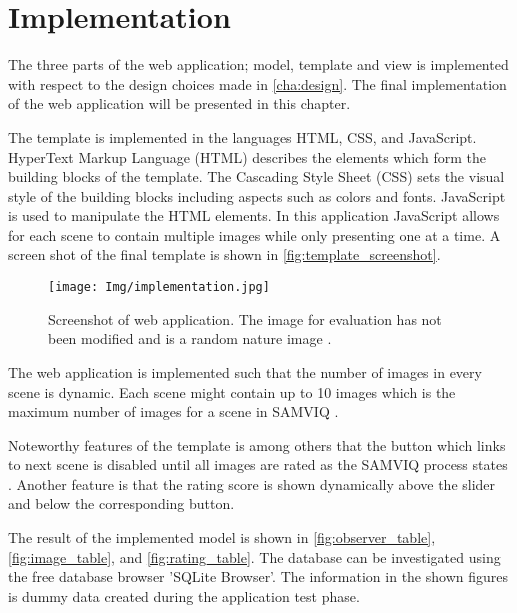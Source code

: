 \graphicspath{{Chapters/Implementation/}}

\chapter{Implementation}
\label{cha:implementation}

The three parts of the web application; model, template and view is implemented with respect to the design choices made in \autoref{cha:design}. The final implementation of the web application will be presented in this chapter.

The template is implemented in the languages HTML, CSS, and JavaScript. HyperText Markup Language (HTML) describes the elements which form the building blocks of the template. The Cascading Style Sheet (CSS) sets the visual style of the building blocks including aspects such as colors and fonts. JavaScript is used to manipulate the HTML elements. In this application JavaScript allows for each scene to contain multiple images while only presenting one at a time. A screen shot of the final template is shown in \autoref{fig:template_screenshot}.

\begin{figure}[H]
	\centering
	\texttt{[image: Img/implementation.jpg]}
	\caption{Screenshot of web application. The image for evaluation has not been modified and is a random nature image \cite{wallpapers_craft}.}
	\label{fig:template_screenshot}
\end{figure}

The web application is implemented such that the number of images in every scene is dynamic. Each scene might contain up to 10 images which is the maximum number of images for a scene in SAMVIQ \cite{Kozamernik2005}.

Noteworthy features of the template is among others that the button which links to next scene is disabled until all images are rated as the SAMVIQ process states \cite{Street}. Another feature is that the rating score is shown dynamically above the slider and below the corresponding button.

The result of the implemented model is shown in \autoref{fig:observer_table}, \autoref{fig:image_table}, and \autoref{fig:rating_table}. The database can be investigated using the free database browser 'SQLite Browser'\cite{sqlite_browser}. The information in the shown figures is dummy data created during the application test phase.

